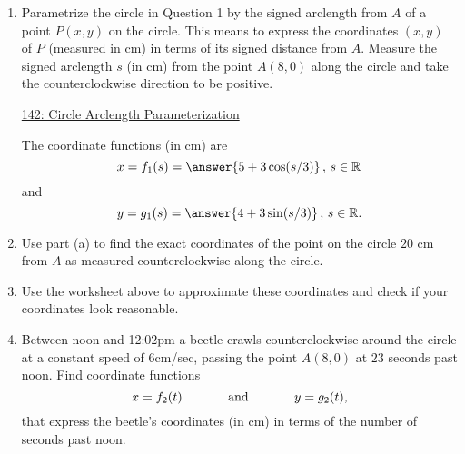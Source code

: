 \documentclass{ximera}
\begin{document}
\begin{question}  \label{QDF09555dfdfLKDD}
\begin{enumerate}

\item Parametrize the circle in Question 1 by the signed arclength from $A$ of a point $P(x,y)$ on the circle. This means to express the coordinates $(x,y)$ of $P$ (measured in cm) in terms of its signed distance from $A$. Measure the signed arclength $s$ (in cm)  from the point $A(8,0)$ along the circle and take the counterclockwise direction to be positive. 

\begin{onlineOnly}
    \begin{center}
\end{center}
\end{onlineOnly}

\href{https://www.desmos.com/calculator/llrzcv5ckf}{142: Circle Arclength Parameterization}



The coordinate functions (in cm) are 
\[
  x = f_1(s) = \answer{5 + 3 \cos(s/3)} \, , \, s\in \mathbb{R}
\]
and
\[
   y = g_1(s) = \answer{4 + 3 \sin(s/3)} \, , \, s\in \mathbb{R} .
\]

\item Use part (a) to find the exact coordinates of the point on the circle  $20$ cm from $A$ as measured counterclockwise along the circle. 

\item Use the worksheet above to approximate these coordinates and check if your coordinates look reasonable.

\item Between noon and 12:02pm a beetle crawls counterclockwise around the circle at a constant speed of $6$cm/sec, passing the point $A(8,0)$ at $23$ seconds past noon. Find coordinate functions
\[
   x = f_2(t)  \hskip 0.5 in \text{and} \hskip 0.5in  y=g_2(t) ,
\] 
that express the beetle's coordinates (in cm) in terms of the number of seconds past noon.

\end{enumerate}
\end{question}
\end{document}
